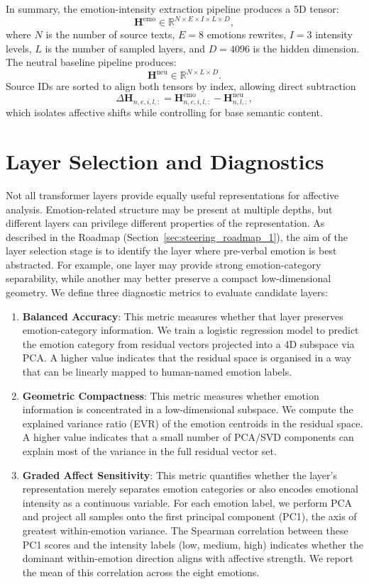 In summary, the emotion-intensity extraction pipeline produces a 5D tensor:
\[
\mathbf{H}^{\text{emo}} \in \mathbb{R}^{N \times E \times I \times L \times D},
\]
where $N$ is the number of source texts, $E=8$ emotions rewrites, $I=3$ intensity levels, $L$ is the number of sampled layers, and $D=4096$ is the hidden dimension. The neutral baseline pipeline produces:
\[
\mathbf{H}^{\text{neu}} \in \mathbb{R}^{N \times L \times D}.
\]
Source IDs are sorted to align both tensors by index, allowing direct subtraction
\[
\Delta\mathbf{H}_{n,e,i,l,:}=\mathbf{H}^{\text{emo}}_{n,e,i,l,:}-\mathbf{H}^{\text{neu}}_{n,l,:},
\]
which isolates affective shifts while controlling for base semantic content.

\section{Layer Selection and Diagnostics}
\label{sec:layer_selection}

Not all transformer layers provide equally useful representations for affective analysis. Emotion-related structure may be present at multiple depths, but different layers can privilege different properties of the representation. As described in the Roadmap (Section~\ref{sec:steering_roadmap_1}), the aim of the layer selection stage is to identify the layer where pre-verbal emotion is best abstracted. For example, one layer may provide strong emotion-category separability, while another may better preserve a compact low-dimensional geometry. We define three diagnostic metrics to evaluate candidate layers:

\begin{enumerate}
  \item \textbf{Balanced Accuracy}: This metric measures whether that layer preserves emotion-category information. We train a logistic regression model to predict the emotion category from residual vectors projected into a 4D subspace via PCA. A higher value indicates that the residual space is organised in a way that can be linearly mapped to human-named emotion labels.
  \item \textbf{Geometric Compactness}: This metric measures whether emotion information is concentrated in a low-dimensional subspace. We compute the explained variance ratio (EVR) of the emotion centroids in the residual space. A higher value indicates that a small number of PCA/SVD components can explain most of the variance in the full residual vector set.
  \item \textbf{Graded Affect Sensitivity}: This metric quantifies whether the layer's representation merely separates emotion categories or also encodes emotional intensity as a continuous variable. For each emotion label, we perform PCA and project all samples onto the first principal component (PC1), the axis of greatest within-emotion variance. The Spearman correlation between these PC1 scores and the intensity labels (low, medium, high) indicates whether the dominant within-emotion direction aligns with affective strength. We report the mean of this correlation across the eight emotions.
\end{enumerate}

